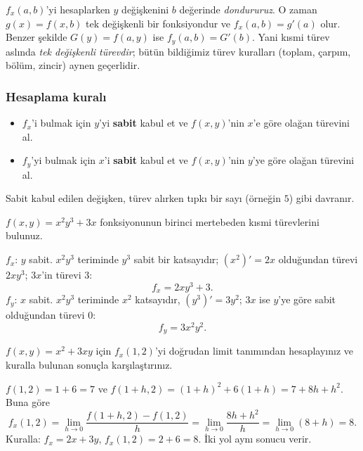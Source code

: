 \begin{bilgi}
$f_x(a,b)$'yi hesaplarken $y$ değişkenini $b$ değerinde \emph{dondururuz}. O zaman $g(x)=f(x,b)$ tek değişkenli bir
fonksiyondur ve $f_x(a,b)=g'(a)$ olur. Benzer şekilde $G(y)=f(a,y)$ ise $f_y(a,b)=G'(b)$. Yani kısmi türev aslında
\emph{tek değişkenli türevdir}; bütün bildiğimiz türev kuralları (toplam, çarpım, bölüm, zincir) aynen geçerlidir.
\end{bilgi}

\subsubsection{Hesaplama kuralı}

\begin{teorem}
\begin{itemize}
  \item $f_x$'i bulmak için $y$'yi \textbf{sabit} kabul et ve $f(x,y)$'nin $x$'e göre olağan türevini al.
  \item $f_y$'yi bulmak için $x$'i \textbf{sabit} kabul et ve $f(x,y)$'nin $y$'ye göre olağan türevini al.
\end{itemize}
Sabit kabul edilen değişken, türev alırken tıpkı bir sayı (örneğin $5$) gibi davranır.
\end{teorem}

\begin{soru}
$f(x,y)=x^2y^3+3x$ fonksiyonunun birinci mertebeden kısmi türevlerini bulunuz.
\end{soru}
\begin{cevap}
$f_x$: $y$ sabit. $x^2y^3$ teriminde $y^3$ sabit bir katsayıdır; $(x^2)'=2x$ olduğundan türevi $2xy^3$; $3x$'in türevi $3$:
\[ f_x=2xy^3+3 . \]
$f_y$: $x$ sabit. $x^2y^3$ teriminde $x^2$ katsayıdır, $(y^3)'=3y^2$; $3x$ ise $y$'ye göre sabit olduğundan türevi $0$:
\[ f_y=3x^2y^2 . \]
\end{cevap}

\begin{soru}
$f(x,y)=x^2+3xy$ için $f_x(1,2)$'yi doğrudan limit tanımından hesaplayınız ve kuralla bulunan sonuçla karşılaştırınız.
\end{soru}
\begin{cevap}
$f(1,2)=1+6=7$ ve $f(1+h,2)=(1+h)^2+6(1+h)=7+8h+h^2$. Buna göre
\[
f_x(1,2)=\lim_{h\to0}\frac{f(1+h,2)-f(1,2)}{h}=\lim_{h\to0}\frac{8h+h^2}{h}=\lim_{h\to0}(8+h)=8 .
\]
Kuralla: $f_x=2x+3y$, $f_x(1,2)=2+6=8$. İki yol aynı sonucu verir.
\end{cevap}

